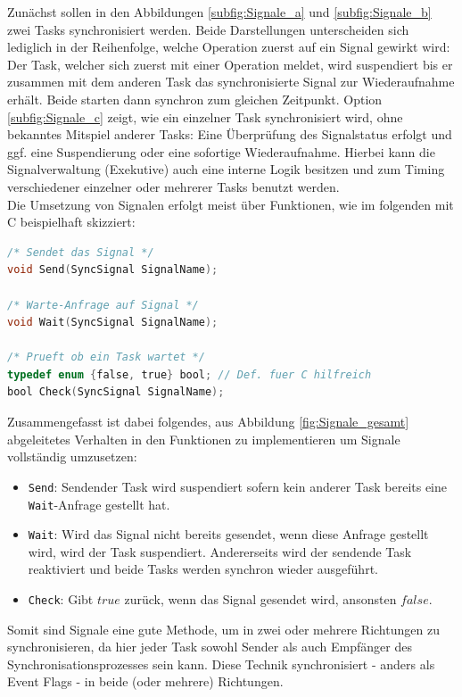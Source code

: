 \documentclass{llncs}
\begin{document}
Zunächst sollen in den Abbildungen \ref{subfig:Signale_a} und \ref{subfig:Signale_b} zwei Tasks synchronisiert werden. Beide Darstellungen unterscheiden sich lediglich in der Reihenfolge, welche Operation zuerst auf ein Signal gewirkt wird: Der Task, welcher sich zuerst mit einer Operation meldet, wird suspendiert bis er zusammen mit dem anderen Task das synchronisierte Signal zur Wiederaufnahme erhält. Beide starten dann synchron zum gleichen Zeitpunkt.
Option \ref{subfig:Signale_c} zeigt, wie ein einzelner Task synchronisiert wird, ohne bekanntes Mitspiel anderer Tasks: Eine Überprüfung des Signalstatus erfolgt und ggf. eine Suspendierung oder eine sofortige Wiederaufnahme. Hierbei kann die Signalverwaltung (Exekutive) auch eine interne Logik besitzen und zum Timing verschiedener einzelner oder mehrerer Tasks benutzt werden.\\

Die Umsetzung von Signalen erfolgt meist über Funktionen, wie im folgenden mit C beispielhaft skizziert:
\begin{lstlisting}[language=C]
/* Sendet das Signal */
void Send(SyncSignal SignalName);

/* Warte-Anfrage auf Signal */
void Wait(SyncSignal SignalName);

/* Prueft ob ein Task wartet */
typedef enum {false, true} bool; // Def. fuer C hilfreich
bool Check(SyncSignal SignalName);
\end{lstlisting}
Zusammengefasst ist dabei folgendes, aus Abbildung \ref{fig:Signale_gesamt} abgeleitetes Verhalten in den Funktionen zu implementieren um Signale vollständig umzusetzen:
\begin{itemize}
	\item \texttt{Send}: Sendender Task wird suspendiert sofern kein anderer Task bereits eine \texttt{Wait}-Anfrage gestellt hat.
	\item \texttt{Wait}: Wird das Signal nicht bereits gesendet, wenn diese Anfrage gestellt wird, wird der Task suspendiert. Andererseits wird der sendende Task reaktiviert und beide Tasks werden synchron wieder ausgeführt.
	\item \texttt{Check}: Gibt $true$ zurück, wenn das Signal gesendet wird, ansonsten $false$.
\end{itemize}
Somit sind Signale eine gute Methode, um in zwei oder mehrere Richtungen zu synchronisieren, da hier jeder Task sowohl Sender als auch Empfänger des Synchronisationsprozesses sein kann. 
Diese Technik synchronisiert - anders als Event Flags - in beide (oder mehrere) Richtungen.
\end{document}
